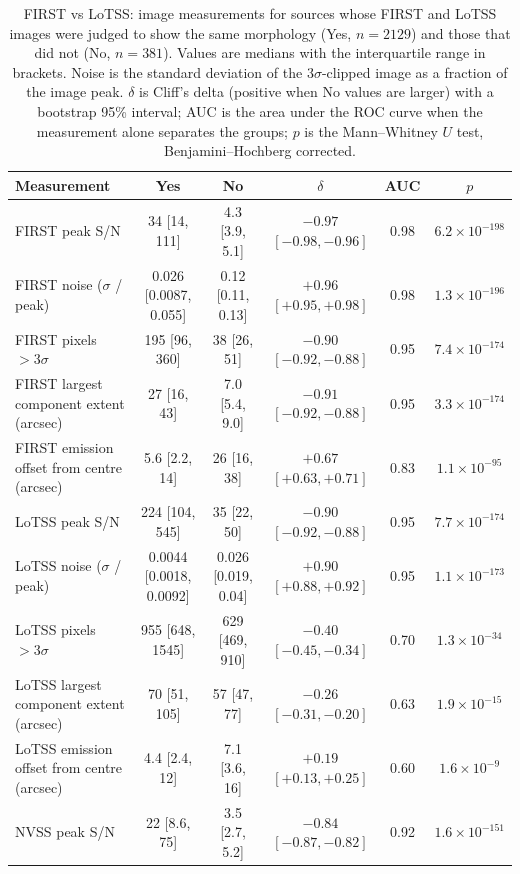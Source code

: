 \begin{table}
\centering
\caption{FIRST vs LoTSS: image measurements for sources whose FIRST and LoTSS images were judged to show the same morphology (Yes, $n=2129$) and those that did not (No, $n=381$). Values are medians with the interquartile range in brackets. Noise is the standard deviation of the $3\sigma$-clipped image as a fraction of the image peak. $\delta$ is Cliff's delta (positive when No values are larger) with a bootstrap 95\% interval; AUC is the area under the ROC curve when the measurement alone separates the groups; $p$ is the Mann--Whitney $U$ test, Benjamini--Hochberg corrected.}
\label{tab:morphology_review_FIRST_vs_LoTSS}
\begin{tabular}{lccccc}
\hline
Measurement & Yes & No & $\delta$ & AUC & $p$ \\
\hline
FIRST peak S/N & 34 [14, 111] & 4.3 [3.9, 5.1] & $-0.97$ $[-0.98, -0.96]$ & 0.98 & $6.2\times10^{-198}$ \\
FIRST noise ($\sigma$ / peak) & 0.026 [0.0087, 0.055] & 0.12 [0.11, 0.13] & $+0.96$ $[+0.95, +0.98]$ & 0.98 & $1.3\times10^{-196}$ \\
FIRST pixels $>3\sigma$ & 195 [96, 360] & 38 [26, 51] & $-0.90$ $[-0.92, -0.88]$ & 0.95 & $7.4\times10^{-174}$ \\
FIRST largest component extent (arcsec) & 27 [16, 43] & 7.0 [5.4, 9.0] & $-0.91$ $[-0.92, -0.88]$ & 0.95 & $3.3\times10^{-174}$ \\
FIRST emission offset from centre (arcsec) & 5.6 [2.2, 14] & 26 [16, 38] & $+0.67$ $[+0.63, +0.71]$ & 0.83 & $1.1\times10^{-95}$ \\
LoTSS peak S/N & 224 [104, 545] & 35 [22, 50] & $-0.90$ $[-0.92, -0.88]$ & 0.95 & $7.7\times10^{-174}$ \\
LoTSS noise ($\sigma$ / peak) & 0.0044 [0.0018, 0.0092] & 0.026 [0.019, 0.04] & $+0.90$ $[+0.88, +0.92]$ & 0.95 & $1.1\times10^{-173}$ \\
LoTSS pixels $>3\sigma$ & 955 [648, 1545] & 629 [469, 910] & $-0.40$ $[-0.45, -0.34]$ & 0.70 & $1.3\times10^{-34}$ \\
LoTSS largest component extent (arcsec) & 70 [51, 105] & 57 [47, 77] & $-0.26$ $[-0.31, -0.20]$ & 0.63 & $1.9\times10^{-15}$ \\
LoTSS emission offset from centre (arcsec) & 4.4 [2.4, 12] & 7.1 [3.6, 16] & $+0.19$ $[+0.13, +0.25]$ & 0.60 & $1.6\times10^{-9}$ \\
NVSS peak S/N & 22 [8.6, 75] & 3.5 [2.7, 5.2] & $-0.84$ $[-0.87, -0.82]$ & 0.92 & $1.6\times10^{-151}$ \\

\end{tabular}
\end{table}
